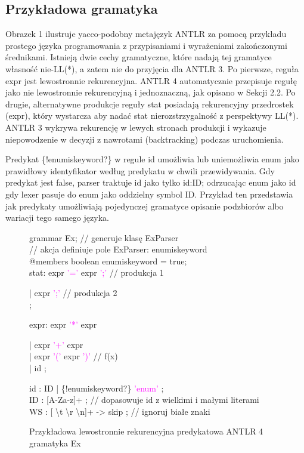 \subsection{Przykładowa gramatyka}
Obrazek 1 ilustruje yacco-podobny metajęzyk ANTLR za pomocą przykładu prostego języka
programowania z przypisaniami i wyrażeniami zakończonymi średnikami. 
Istnieją dwie cechy gramatyczne, które nadają tej gramatyce własność nie-LL(*),
a zatem nie do przyjęcia dla ANTLR 3.
Po pierwsze, reguła expr jest lewostronnie rekurencyjna.
ANTLR 4 automatycznie przepisuje regułę jako nie lewostronnie rekurencyjną i jednoznaczną,
jak opisano w Sekcji 2.2. Po drugie, alternatywne produkcje reguły stat posiadają
rekurencyjny przedrostek (expr), który wystarcza aby nadać stat nierozstrzygalność
z perspektywy LL(*). ANTLR 3 wykrywa rekurencję w lewych stronach produkcji i
wykazuje niepowodzenie w decyzji z nawrotami (backtracking) podczas uruchomienia.
\par
Predykat \{!enum\textunderscore is\textunderscore keyword?\} w regule id
umożliwia lub uniemożliwia enum jako prawidłowy identyfikator według predykatu
w chwili przewidywania. Gdy predykat jest false, parser traktuje id jako
tylko id:ID; odrzucając enum jako id gdy lexer pasuje do enum jako oddzielny
symbol ID. Przykład ten przedstawia jak predykaty umożliwiają pojedynczej
gramatyce opisanie podzbiorów albo wariacji tego samego języka. 
\begin{figure}[!ht]
grammar Ex; \textcolor{PineGreen}{// generuje klasę ExParser} \\
\textcolor{PineGreen}{// akcja definiuje pole ExParser: enum\textunderscore is\textunderscore keyword} \\
@members { boolean enum\textunderscore is\textunderscore keyword = true;} \\
stat: expr \textcolor{magenta}{'='} expr \textcolor{magenta}{';'} \textcolor{PineGreen}{// produkcja 1}
\begin{adjustwidth}{1cm}{}
  | expr \textcolor{magenta}{';'} \textcolor{PineGreen}{// produkcja 2} \\
  ; 
\end{adjustwidth}
expr: expr \textcolor{magenta}{'*'} expr
\begin{adjustwidth}{1cm}{}
    | expr \textcolor{magenta}{'+'} expr \\
    | expr \textcolor{magenta}{'('} expr \textcolor{magenta}{')'} \textcolor{PineGreen}{// f(x)} \\
    | id 
    ; \\
\end{adjustwidth}    
id : ID | \{!enum\textunderscore is\textunderscore keyword?\} \textcolor{magenta}{'enum'} ; \\
ID : [A-Za-z]+ ; \textcolor{PineGreen}{// dopasowuje id z wielkimi i małymi literami} \\
WS : [ \textbackslash t \textbackslash r \textbackslash n]+ -> skip ; \textcolor{PineGreen}{// ignoruj białe znaki} \\
\caption{Przykładowa lewostronnie rekurencyjna predykatowa ANTLR 4 gramatyka Ex}
\end{figure}
